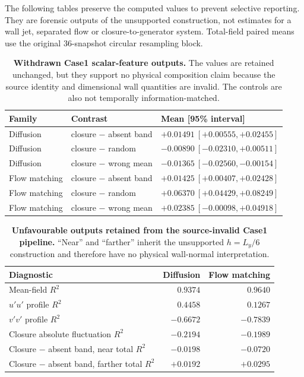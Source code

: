 \documentclass[11pt]{article}
\begin{document}
The following tables preserve the computed values to prevent selective reporting. They are
forensic outputs of the unsupported construction, not estimates for a wall jet, separated flow or
closure-to-generator system. Total-field paired means use the original 36-snapshot circular
resampling block.

\begin{table}[h]
\centering
\small
\begin{tabular}{@{}lll@{}}
\toprule
Family & Contrast & Mean [95\% interval] \\
\midrule
Diffusion & closure $-$ absent band & $+0.01491\ [ +0.00555,+0.02455]$ \\
Diffusion & closure $-$ random & $-0.00890\ [ -0.02310,+0.00511]$ \\
Diffusion & closure $-$ wrong mean & $-0.01365\ [ -0.02560,-0.00154]$ \\
Flow matching & closure $-$ absent band & $+0.01425\ [ +0.00407,+0.02428]$ \\
Flow matching & closure $-$ random & $+0.06370\ [ +0.04429,+0.08249]$ \\
Flow matching & closure $-$ wrong mean & $+0.02385\ [ -0.00098,+0.04918]$ \\
\bottomrule
\end{tabular}
\caption{\textbf{Withdrawn Case1 scalar-feature outputs.} The values are retained unchanged, but
they support no physical composition claim because the source identity and dimensional wall
quantities are invalid. The controls are also not temporally information-matched.}
\end{table}

\begin{table}[h]
\centering
\small
\begin{tabular}{@{}lrr@{}}
\toprule
Diagnostic & Diffusion & Flow matching \\
\midrule
Mean-field $R^2$ & $0.9374$ & $0.9640$ \\
$u'u'$ profile $R^2$ & $0.4458$ & $0.1267$ \\
$v'v'$ profile $R^2$ & $-0.6672$ & $-0.7839$ \\
Closure absolute fluctuation $R^2$ & $-0.2194$ & $-0.1989$ \\
Closure $-$ absent band, near total $R^2$ & $-0.0198$ & $-0.0720$ \\
Closure $-$ absent band, farther total $R^2$ & $+0.0192$ & $+0.0295$ \\
\bottomrule
\end{tabular}
\caption{\textbf{Unfavourable outputs retained from the source-invalid Case1 pipeline.} ``Near''
and ``farther'' inherit the unsupported $h=L_y/6$ construction and therefore have no physical
wall-normal interpretation.}
\end{table}
\end{document}
